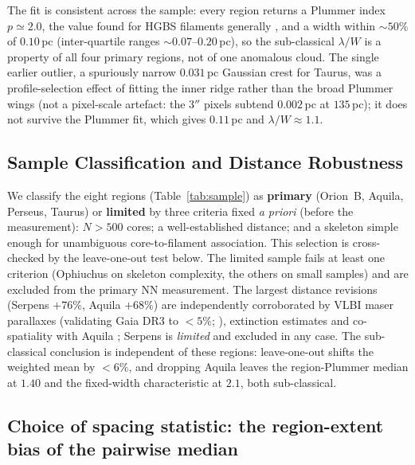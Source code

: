 \documentclass[usenatbib,twoside,twocolumn]{mnras}
\begin{document}
The fit is consistent across the sample: every region returns a Plummer index $p\simeq2.0$, the value found for HGBS filaments generally \citep{Arzoumanian2019}, and a width within $\sim50\%$ of $0.10$\,pc (inter-quartile ranges $\sim0.07$--$0.20$\,pc), so the sub-classical $\lambda/W$ is a property of all four primary regions, not of one anomalous cloud. The single earlier outlier, a spuriously narrow $0.031$\,pc Gaussian crest for Taurus, was a profile-selection effect of fitting the inner ridge rather than the broad Plummer wings (not a pixel-scale artefact: the $3''$ pixels subtend $0.002$\,pc at $135$\,pc); it does not survive the Plummer fit, which gives $0.11$\,pc and $\lambda/W\approx1.1$.

\subsection{Sample Classification and Distance Robustness}
\label{sec:distance_uncertainties}

We classify the eight regions (Table~\ref{tab:sample}) as \textbf{primary} (Orion~B, Aquila, Perseus, Taurus) or \textbf{limited} by three criteria fixed \emph{a priori} (before the measurement): $N>500$ cores; a well-established distance; and a skeleton simple enough for unambiguous core-to-filament association. This selection is cross-checked by the leave-one-out test below. The limited sample fails at least one criterion (Ophiuchus on skeleton complexity, the others on small samples) and are excluded from the primary NN measurement. The largest distance revisions (Serpens $+76\%$, Aquila $+68\%$) are independently corroborated by VLBI maser parallaxes (validating Gaia DR3 to $<5\%$; \citealt{Kounkel2018,Xu2021,OrtizLeon2018,OrtizLeon2017}), extinction estimates \citep{Yan2022,Green2024} and co-spatiality with Aquila \citep{Zucker2020}; Serpens is \emph{limited} and excluded in any case. The sub-classical conclusion is independent of these regions: leave-one-out shifts the weighted mean by $<6\%$, and dropping Aquila leaves the region-Plummer median at $1.40$ and the fixed-width characteristic at $2.1$, both sub-classical.


\subsection{Choice of spacing statistic: the region-extent bias of the pairwise median}
\label{sec:statistics}
\end{document}
